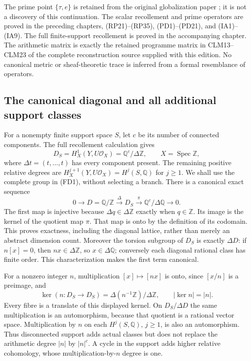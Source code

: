 \documentclass[11pt,a4paper]{article}
\theoremstyle{definition}\newtheorem{definition}[theorem]{Definition}
\begin{document}
The prime point $\{\tau,e\}$ is retained from the original globalization
paper \cite{globalization}; it is not a discovery of this continuation.
The scalar recollement and prime operators are proved in the preceding
chapters, (RP21)--(RP35), (PD1)--(PD21), and (IA1)--(IA9).
The full finite-support recollement is proved in the accompanying
chapter. The arithmetic matrix is exactly the retained programme
matrix in CLM13--CLM23 of the complete reconstruction source supplied
with this edition. No canonical metric or sheaf-theoretic trace is
inferred from a formal resemblance of operators.

\subsection{The canonical diagonal and all additional support classes}
For a nonempty finite support space $S$, let $c$ be its number of
connected components. The full recollement calculation gives
\[
 D_S=H^1_X(Y,U\mathcal O_X)=\mathbb Q^c/\Delta\mathbb Z,
 \qquad X=\operatorname{Spec}\mathbb Z,
 \tag{FD1}
\]
where $\Delta t=(t,\ldots,t)$ has every component present.
The remaining positive relative degrees are
$H_X^{j+1}(Y,U\mathcal O_X)=H^j(S,\mathbb Q)$ for $j\ge1$.
We shall use the complete group in (FD1), without selecting a branch.
There is a canonical exact sequence
\[
 0\longrightarrow D=\mathbb Q/\mathbb Z
 \xrightarrow{\Delta}D_S
 \xrightarrow{\pi}\mathbb Q^c/\Delta\mathbb Q
 \longrightarrow0.
 \tag{FD2}
\]
The first map is injective because $\Delta q\in\Delta\mathbb Z$
exactly when $q\in\mathbb Z$. Its image is the kernel of the quotient
map $\pi$. That map is onto by the definition of its codomain. This
proves exactness, including the diagonal lattice, rather than merely
an abstract dimension count. Moreover the torsion subgroup of $D_S$
is exactly $\Delta D$: if $n[x]=0$, then $nx\in\Delta\mathbb Z$,
so $x\in\Delta\mathbb Q$; conversely each diagonal rational class
has finite order. This characterization makes the first term canonical.

For a nonzero integer $n$, multiplication $[x]\mapsto[nx]$ is onto,
since $[x/n]$ is a preimage, and
\[
 \ker(n:D_S\to D_S)
   =\Delta(n^{-1}\mathbb Z)/\Delta\mathbb Z,
 \qquad |\ker n|=|n|.
 \tag{FD3}
\]
Every fibre is a translate of this displayed kernel. On
$D_S/\Delta D$ the same multiplication is an automorphism, because
that quotient is a rational vector space. Multiplication by $n$ on
each $H^j(S,\mathbb Q)$, $j\ge1$, is also an automorphism.
Thus disconnected support adds actual classes but does not replace
the arithmetic degree $|n|$ by $|n|^c$. A cycle in the support adds
higher relative cohomology, whose multiplication-by-$n$ degree is one.
\end{document}
